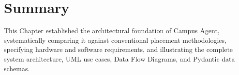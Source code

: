 \section{Summary} \label{S3.8}
This Chapter established the architectural foundation of Campus Agent, systematically comparing it against conventional placement methodologies, specifying hardware and software requirements, and illustrating the complete system architecture, UML use cases, Data Flow Diagrams, and Pydantic data schemas.
